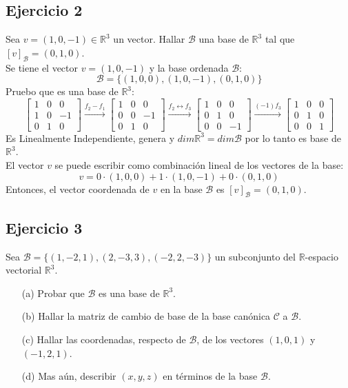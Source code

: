 \documentclass[a4paper,12pt]{article}
\begin{document}
\subsection{Ejercicio 2}
Sea $v=(1,0,-1)\in\mathds{R}^3$ un vector. Hallar $\mathcal{B}$ una base de $\mathds{R}^3$ tal que $[v]_{\mathcal{B}}=(0,1,0)$. \\
Se tiene el vector $v=(1,0,-1)$ y la base ordenada $\mathcal{B}$:
$$
\mathcal{B} = \{ (1,0,0), (1,0,-1), (0,1,0) \}
$$
Pruebo que es una base de $\mathds{R}^3$:
$$
\begin{bmatrix}
    1 & 0 & 0 \\
    1 & 0 & -1 \\
    0 & 1 & 0
\end{bmatrix}
\xrightarrow[]{f_2-f_1}
\begin{bmatrix}
    1 & 0 & 0 \\
    0 & 0 & -1 \\
    0 & 1 & 0
\end{bmatrix}
\xrightarrow[]{f_2 \leftrightarrow f_3}
\begin{bmatrix}
    1 & 0 & 0 \\
    0 & 1 & 0 \\
    0 & 0 & -1
\end{bmatrix}
\xrightarrow[]{(-1)f_3}
\begin{bmatrix}
    1 & 0 & 0 \\
    0 & 1 & 0 \\
    0 & 0 & 1
\end{bmatrix}
$$
Es Linealmente Independiente, genera y $dim\mathds{R}^3=dim\mathcal{B}$ por lo tanto es base de $\mathds{R}^3$. \\
El vector $v$ se puede escribir como combinación lineal de los vectores de la base:
$$
v = 0\cdot(1,0,0)+1\cdot(1,0,-1)+0\cdot(0,1,0)
$$
Entonces, el vector coordenada de $v$ en la base $\mathcal{B}$ es $[v]_{\mathcal{B}}=(0,1,0)$.
\subsection{Ejercicio 3}
Sea $\mathcal{B}= \{ (1,-2,1),(2,-3,3), (-2,2,-3) \}$ un subconjunto del $\mathds{R}$-espacio vectorial $\mathds{R}^3$.
\begin{itemize}
    \item[(a)] Probar que $\mathcal{B}$ es una base de $\mathds{R}^3$.
    \item[(b)] Hallar la matriz de cambio de base de la base canónica $\mathcal{C}$ a $\mathcal{B}$.
    \item[(c)] Hallar las coordenadas, respecto de $\mathcal{B}$, de los vectores $(1,0,1)$ y $(-1,2,1)$.
    \item[(d)] Mas aún, describir $(x,y,z)$ en términos de la base $\mathcal{B}$. 
\end{itemize}
\end{document}
